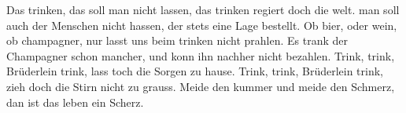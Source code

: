 \beginverse*
Das trinken, das soll man nicht lassen,
das trinken regiert doch die welt.
man soll auch der Menschen nicht hassen,
der stets eine Lage bestellt.
Ob bier, oder wein, ob champagner,
nur lasst uns beim trinken nicht prahlen.
Es trank der Champagner schon mancher,
und konn ihn nachher nicht bezahlen.
\endverse
\beginverse*
Trink, trink, Brüderlein trink,
lass toch die Sorgen zu hause.
Trink, trink, Brüderlein trink,
zieh doch die Stirn nicht zu grauss.
Meide den kummer und meide den Schmerz,
dan ist das leben ein Scherz.
\endverse
\endsong 